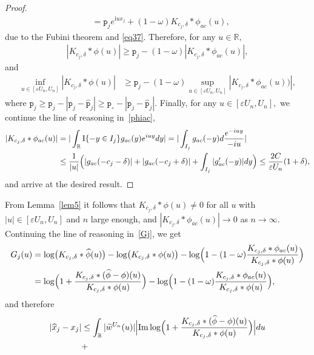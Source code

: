 \documentclass[numbers,webpdf,imaiai]{ima-authoring-template}%
\theoremstyle{thmstyletwo}%
\newcommand{\R}{\mathbb{R}}
\newcommand{\I}{{\mathrm{I}}}
\renewcommand{\i}{\mathrm{i}}
\newcommand{\p}{\mathtt{p}}
\newcommand{\w}{\omega}
\newcommand{\e}{e}
\newcommand{\eps}{\varepsilon}
\renewcommand{\Im}{\operatorname{Im}}
\numberwithin{equation}{section}
\begin{document}
\begin{enumerate}
\begin{proof}
\begin{align*}
    &= \p_j \e^{\i u x_j} + (1 - \w) K_{c_j,\delta} * \phi_{ac}(u),%
\end{align*}
due to the Fubini theorem and \eqref{eq37}. Therefore,  for any \(u \in \R,\)
\begin{eqnarray*}
|K_{c_j,\delta} * \phi(u)|  \geq \p_j - (1-\w) |K_{c_j,\delta} * \phi_{ac}(u)|,
\end{eqnarray*}
and 
\begin{align*}
\inf_{u \in [\eps U_n, U_n]}|K_{c_j,\delta} * \phi(u)| &\geq \p_j  - (1-\w) \sup_{u \in [\eps U_n, U_n]}|K_{c_j,\delta} * \phi_{ac}(u))|,
\end{align*}
where \(\p_j \geq \widehat{\p}_j - | \p_j  - \widehat{\p}_j| \geq \p_\circ-| \p_j  - \widehat{\p}_j|.\)
Finally, for any \(u \in [\eps U_n, U_n],\)  we continue the line of reasoning in~\eqref{phiac},
\begin{align*}
    |K_{c_j,\delta} * \phi_{ac}(u)| &= |\int_{\R} \I\{ -y \in I_j \} g_{ac}(y)e^{iuy}dy| = |\int_{I_j} g_{ac}(-y) d \frac{e^{-iuy}}{-iu}|  \\
    &\leq  \frac{1}{|u|} \Bigl(|g_{ac}(-c_j - \delta)| + |g_{ac}(-c_j + \delta)| + \int_{I_j} |g'_{ac}(-y)| dy \Bigr)\leq \frac{2C}{\varepsilon U_n} (1 +  \delta ),\end{align*}
and arrive at the desired result.
\end{proof}
From Lemma~\ref{lem5} it follows that \(K_{c_j,\delta} * \phi(u)  \ne 0\) for all \(u\) with  \(|u| \in [\eps U_n, U_n]\) and \(n\) large enough, and \(|K_{c_j,\delta} * \phi_{ac}(u)| \to 0\) as \(n \to \infty\).  Continuing the line of reasoning in~\eqref{Gj}, we get 
 \begin{align*}
   G_j(u)  &=
     \log \bigl(K_{c_j,\delta} * \widehat{\phi}(u)\bigr)  - \log \bigl(K_{c_j,\delta} * \phi(u) \bigr) - \log\Bigl(1 - (1-\w )\frac{K_{c_j,\delta} * \phi_{ac}(u)}{K_{c_j,\delta} * \phi(u)}\Bigr) \\
    &=\log \Bigl( 1 + \frac{K_{c_j,\delta} * (\widehat{\phi} - \phi)(u)}{K_{c_j,\delta} * \phi(u)}\Bigr)- \log\Bigl(1 - (1- \w )\frac{K_{c_j,\delta} * \phi_{ac}(u)}{K_{c_j,\delta} * \phi(u)}\Bigr),
\end{align*}
and therefore 
\begin{align*}
    |\widehat{x}_j - x_j| &\leq
 \int_{\R}  |\widetilde{w}^{U_n} (u) |
\Bigl| \Im \log \Bigl( 1 + \frac{K_{c_j,\delta} * (\widehat{\phi} - \phi)(u)}{K_{c_j,\delta} * \phi(u)}\Bigr) \Bigr|
 du \\ 
 & + 

\end{align*}
\end{enumerate}
\end{document}
